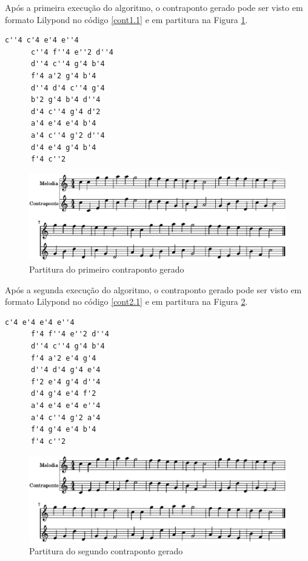     Após a primeira execução do algoritmo, o contraponto gerado pode ser visto em formato Lilypond no código \ref{cont1.1} e em partitura na Figura \ref{cont1.2}.

    \begin{lstlisting}[caption={Primeiro contraponto gerado}, label={cont1.1}]
      c''4 c'4 e'4 e''4
      c''4 f''4 e''2 d''4
      d''4 c''4 g'4 b'4
      f'4 a'2 g'4 b'4
      d''4 d'4 c''4 g'4
      b'2 g'4 b'4 d''4
      d'4 c''4 g'4 d'2
      a'4 e'4 e'4 b'4
      a'4 c''4 g'2 d''4
      d'4 e'4 g'4 b'4
      f'4 c''2
    \end{lstlisting}

    \begin{figure}[htb]
      \centering
      \includegraphics[scale=0.6]{figuras/cont1.2.eps}
      \caption{Partitura do primeiro contraponto gerado}
      \label{cont1.2}
    \end{figure}

    Após a segunda execução do algoritmo, o contraponto gerado pode ser visto em formato Lilypond no código \ref{cont2.1} e em partitura na Figura \ref{cont2.2}.

    \begin{lstlisting}[caption={Segundo contraponto gerado}, label={cont2.1}]
      c'4 e'4 e'4 e''4
      f'4 f''4 e''2 d''4
      d''4 c''4 g'4 b'4
      f'4 a'2 e'4 g'4
      d''4 d'4 g'4 e'4
      f'2 e'4 g'4 d''4
      d'4 g'4 e'4 f'2
      a'4 e'4 e'4 e''4
      a'4 c''4 g'2 a'4
      f'4 g'4 e'4 b'4
      f'4 c''2
    \end{lstlisting}

    \begin{figure}[htb]
      \centering
      \includegraphics[scale=0.6]{figuras/cont2.2.eps}
      \caption{Partitura do segundo contraponto gerado}
      \label{cont2.2}
    \end{figure}

